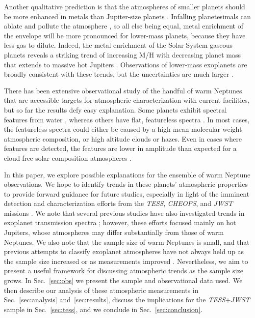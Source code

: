\documentclass[twocolumn]{aastex61}
\begin{document}
 Another qualitative prediction is that the atmospheres of smaller planets should be more enhanced in metals than Jupiter-size planets \citep[e.g.][]{fortney:2013, venturini:2016}. Infalling planetesimals can ablate and pollute the atmosphere \citep[e.g][]{pinhas:2016, mordasini:2016}, so all else being equal, metal enrichment of the envelope will be more pronounced for lower-mass planets,  because they have less gas to dilute. Indeed, the metal enrichment of the Solar System gaseous planets \citep[e.g.,][]{karkoschka:2011,luszcz-cook:2013,guillot:2014} reveals a striking trend of increasing M/H with decreasing planet mass that extends to massive hot Jupiters \citep{kreidberg:2014}. Observations of lower-mass exoplanets are broadly consistent with these trends, but the uncertainties are much larger \citep{moses:2013,fraine:2014,morley:2017,wakeford:2017}. 

There has been extensive observational study of the handful of warm Neptunes that are accessible targets for atmospheric characterization with current facilities, but so far the results defy easy explanation. Some planets exhibit spectral features from water \citep{fraine:2014, wakeford:2017}, whereas others have flat, featureless spectra \citep[e.g.][]{kreidberg:2014, knutson:2014a}. In most cases, the featureless spectra could either be caused by a high mean molecular weight atmospheric composition, or high altitude clouds or hazes. Even in cases where features are detected, the features are lower in amplitude than expected for a cloud-free solar composition atmospheres \citep{fraine:2014,wakeford:2017,fu:2017}.

In this paper, we explore possible explanations for the ensemble of
warm Neptune observations. We hope to identify trends in these
planets' atmospheric properties to provide forward guidance for future
studies, especially in light of the imminent detection and
characterization efforts from the {\em TESS}, {\em CHEOPS}, and {\em
  JWST} missions \citep{broeg:2013, ricker:2014}.  We note that
several previous studies have also investigated trends in exoplanet
transmission spectra \citep{stevenson:2016b,heng:2016,fu:2017}; however, these
efforts focused mainly on hot Jupiters, whose atmospheres may differ
substantially from those of warm Neptunes.  We also note that the
sample size of warm Neptunes is small, and that previous attempts to
classify exoplanet atmospheres have not always held up as the sample
size increased or as measurements improved
\cite[e.g.,][]{hansen:2007,fortney:2008,knutson:2010,madhusudhan:2011b}. Nevertheless,
we aim to present a useful framework for discussing atmospheric trends
as the sample size grows. In Sec.~\ref{sec:obs} we present the sample
and observational data used.  We then describe our analysis of these
atmospheric measurements in Sec.~\ref{sec:analysis}
and~\ref{sec:results}, discuss the implications for the {\em
  TESS}+{\em JWST} sample in Sec.~\ref{sec:tess}, and we conclude in
Sec.~\ref{sec:conclusion}.
\end{document}
